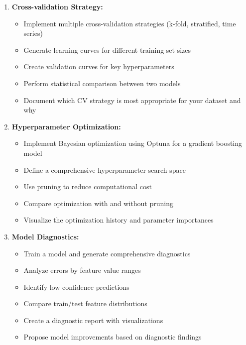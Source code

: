 \begin{enumerate}
    \item \textbf{Cross-validation Strategy:}
    \begin{itemize}
        \item Implement multiple cross-validation strategies (k-fold, stratified, time series)
        \item Generate learning curves for different training set sizes
        \item Create validation curves for key hyperparameters
        \item Perform statistical comparison between two models
        \item Document which CV strategy is most appropriate for your dataset and why
    \end{itemize}

    \item \textbf{Hyperparameter Optimization:}
    \begin{itemize}
        \item Implement Bayesian optimization using Optuna for a gradient boosting model
        \item Define a comprehensive hyperparameter search space
        \item Use pruning to reduce computational cost
        \item Compare optimization with and without pruning
        \item Visualize the optimization history and parameter importances
    \end{itemize}

    \item \textbf{Model Diagnostics:}
    \begin{itemize}
        \item Train a model and generate comprehensive diagnostics
        \item Analyze errors by feature value ranges
        \item Identify low-confidence predictions
        \item Compare train/test feature distributions
        \item Create a diagnostic report with visualizations
        \item Propose model improvements based on diagnostic findings
    \end{itemize}


\end{enumerate}
